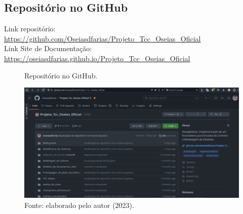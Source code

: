
\begin{apendicesenv}
\partapendices

\chapter{Repositório no GitHub} %
\label{apendice_1}

\noindent Link repositório:\\
\href{https://github.com/Oseiasdfarias/Projeto\_Tcc\_Oseias\_Oficial}{https://github.com/Oseiasdfarias/Projeto\_Tcc\_Oseias\_Oficial}\\

\noindent Link Site de Documentação:\\ \href{https://oseiasdfarias.github.io/Projeto\_Tcc\_Oseias\_Oficial/}{https://oseiasdfarias.github.io/Projeto\_Tcc\_Oseias\_Oficial}\\

\begin{figure}[!h]
	\centering
	\caption{Repositório no GitHub.}
	\includegraphics[width=1.0\textwidth]{utils/repo_github.eps}
	\caption*{Fonte: elaborado pelo autor (2023).}
	\label{fig3:image_27}
\end{figure}


%

\end{apendicesenv}
